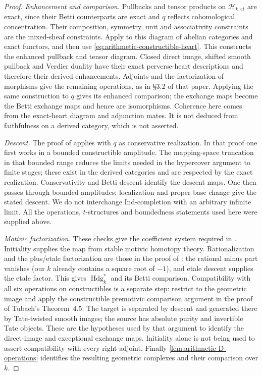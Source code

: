 \documentclass[11pt]{article}
\numberwithin{equation}{section}
\theoremstyle{definition}
\theoremstyle{remark}
\begin{document}
\begin{proof}
\emph{Enhancement and comparison.}
Pullbacks and tensor products on $\mathcal H_{k,\mathrm{ct}}$ are
exact, since their Betti counterparts are exact and $q$ reflects
cohomological concentration. Their composition, symmetry, unit and
associativity constraints are the mixed-sheaf constraints. Apply
\cite[Theorem~3.3 and Proposition~3.5]{Tubach} to this diagram of
abelian categories and exact functors, and then use
\eqref{eq:arithmetic-constructible-heart}. This constructs the enhanced
pullback and tensor diagram. Closed direct image, shifted smooth pullback
and Verdier duality have their exact perverse-heart descriptions and
therefore their derived enhancements. Adjoints and the factorization of
morphisms give the remaining operations, as in \S3.2 of that paper.
Applying the same construction to $q$ gives its enhanced comparison;
the exchange maps become the Betti exchange maps and hence are
isomorphisms. Coherence here comes from the exact-heart diagram and
adjunction mates. It is not deduced from faithfulness on a derived
category, which is not asserted.

\emph{Descent.}
The proof of \cite[Theorem~3.24]{Tubach} applies with $q$ as conservative
realization. In that proof one first works in a bounded constructible
amplitude. The mapping-space truncation in that bounded range reduces
the limits needed in the hypercover argument to finite stages; these
exist in the derived categories and are respected by the exact
realization. Conservativity and Betti descent identify the descent
maps. One then passes through bounded amplitudes; localization and
proper base change give the stated descent. We do not interchange
Ind-completion with an arbitrary infinite limit. All the operations,
$t$-structures and boundedness statements used here were supplied above.

\emph{Motivic factorization.}
These checks give the coefficient system required in
\cite[Definitions~7.5, 7.7 and Theorem~7.14]{DrewGallauer}.
Initiality supplies the map from stable motivic homotopy theory.
Rationalization and the plus/etale factorization are those in the proof
of \cite[Theorem~4.5 and Lemma~4.7]{Tubach}: the rational minus part
vanishes (our $k$ already contains a square root of $-1$), and etale
descent supplies the etale factor. This gives
$\operatorname{Hdg}_k^*$ and its Betti comparison.
Compatibility with all six operations on constructibles is a separate
step: restrict to the geometric image and apply the constructible
premotivic comparison argument in the proof of Tubach's Theorem~4.5.
The target is separated by descent and generated there by Tate-twisted
smooth images; the source has absolute purity and invertible Tate
objects. These are the hypotheses used by that argument to identify the
direct-image and exceptional exchange maps. Initiality alone is not
being used to assert compatibility with every right adjoint.
Finally \cref{lem:arithmetic-D-operations} identifies the resulting
geometric complexes and their comparison over $k$.
\end{proof}
\end{document}
